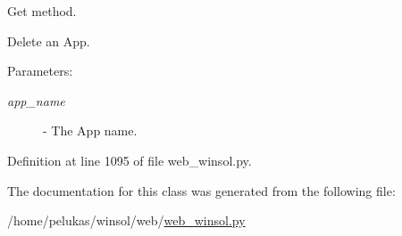 Get method. 

Delete an App.

\begin{Desc}
\item[Parameters:]
\begin{description}
\item[{\em app\_\-name}]- The App name. \end{description}
\end{Desc}


Definition at line 1095 of file web\_\-winsol.py.

The documentation for this class was generated from the following file:\begin{CompactItemize}
\item 
/home/pelukas/winsol/web/\hyperlink{web__winsol_8py}{web\_\-winsol.py}\end{CompactItemize}
